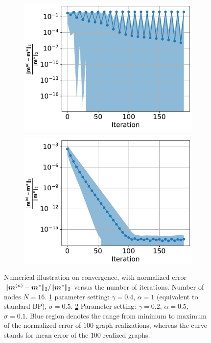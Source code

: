 \begin{figure}[!t]
  \begin{subfigure}{0.5\textwidth}
    \includegraphics[width=1\columnwidth]
    {figures/converge/converge_erp0_4_alpha_1_stn_0_5_vs_filter_false_crop.pdf}
    \caption{}
    \label{fig:log-error-iter-diverse}
  \end{subfigure}
  \begin{subfigure}{0.5\textwidth}
    \includegraphics[width=1\columnwidth]{figures/converge/converge_erp0_2_alpha_0_5_stn_0_1_vs_filter_true-crop.pdf}
    \caption{}
    \label{fig:log-error-iter-converge}
  \end{subfigure}
  \caption{Numerical illustration on convergence, with normalized error ${\| \bm{m}^{(n)}-\bm{m}^{\ast} \|_{2}}/{\| \bm{m}^{\ast} \|_{2}}$ versus the number of iterations. Number of nodes $N=16$. \ref{fig:log-error-iter-diverse} parameter setting: $\gamma =0.4$, $\alpha = 1$ (equivalent to standard BP), $\sigma = 0.5$. \ref{fig:log-error-iter-converge} Parameter setting: $\gamma =0.2$, $\alpha = 0.5$, $\sigma = 0.1$.
    Blue region denotes the range from minimum to maximum of the normalized error of $100$ graph realizations, whereas the curve stands for mean error of the $100$ realized graphs. }
  \label{fig:mimo_detection}
\end{figure}



